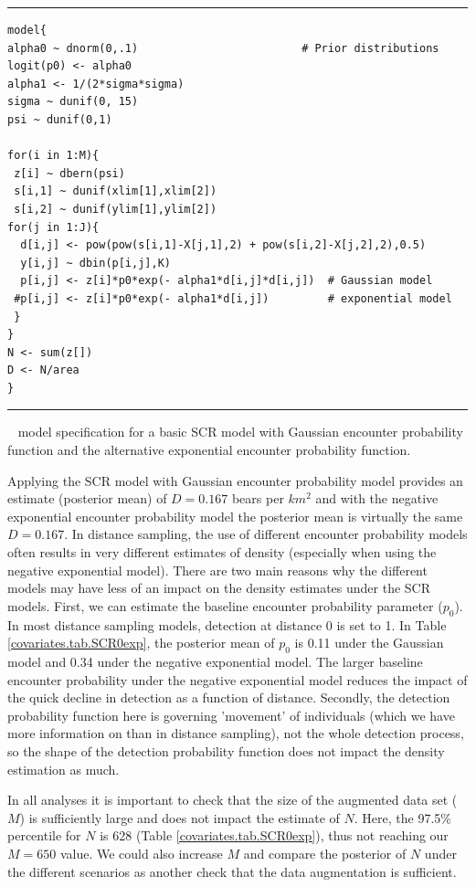 \begin{panel}[htp]
\centering
\rule[0.1in]{\textwidth}{.03in}
{\small
\begin{verbatim}
model{
alpha0 ~ dnorm(0,.1)                         # Prior distributions
logit(p0) <- alpha0
alpha1 <- 1/(2*sigma*sigma)
sigma ~ dunif(0, 15)
psi ~ dunif(0,1)

for(i in 1:M){
 z[i] ~ dbern(psi)
 s[i,1] ~ dunif(xlim[1],xlim[2])
 s[i,2] ~ dunif(ylim[1],ylim[2])
for(j in 1:J){
  d[i,j] <- pow(pow(s[i,1]-X[j,1],2) + pow(s[i,2]-X[j,2],2),0.5)
  y[i,j] ~ dbin(p[i,j],K)
  p[i,j] <- z[i]*p0*exp(- alpha1*d[i,j]*d[i,j])  # Gaussian model
 #p[i,j] <- z[i]*p0*exp(- alpha1*d[i,j])         # exponential model
 }
}
N <- sum(z[])
D <- N/area
}
\end{verbatim}
}
\rule[-0.1in]{\textwidth}{.03in}
\caption{
\jags~ model specification for a basic SCR model with Gaussian
encounter probability function and the alternative exponential encounter probability function.}
\label{covariates.panel.basicSCR}
\end{panel}

Applying the SCR model with Gaussian encounter probability model
provides an estimate (posterior mean) of $D = 0.167$ bears per $km^2$
and with the negative exponential encounter probability model the
posterior mean is virtually the same $D = 0.167$.  In distance
sampling, the use of different encounter probability models often
results in very different estimates of density (especially when using
the negative exponential model).  There are two main reasons why the
different models may have less of an impact on the density estimates
under the SCR models.  First, we can estimate the baseline encounter
probability parameter ($p_0$).  In most distance sampling models,
detection at distance 0 is set to 1.  In Table
\ref{covariates.tab.SCR0exp}, the posterior mean of $p_0$ is 0.11
under the Gaussian model and 0.34 under the negative exponential
model.  The larger baseline encounter probability under the negative
exponential model reduces the impact of the quick decline in detection
as a function of distance.  Secondly, the detection probability
function here is governing 'movement' of individuals (which we have
more information on than in distance sampling), not the whole
detection process, so the shape of the detection probability function
does not impact the density estimation as much.

In all analyses it is important to check that the size of the
augmented data set ($M$) is sufficiently large and does not impact 
the estimate of $N$.  Here, the 97.5\%
percentile for $N$ is 628 (Table \ref{covariates.tab.SCR0exp}), thus not reaching our $M=650$ value.
We could also increase
$M$ and compare the posterior of $N$ under the different scenarios as another check 
that the data augmentation is sufficient.  

